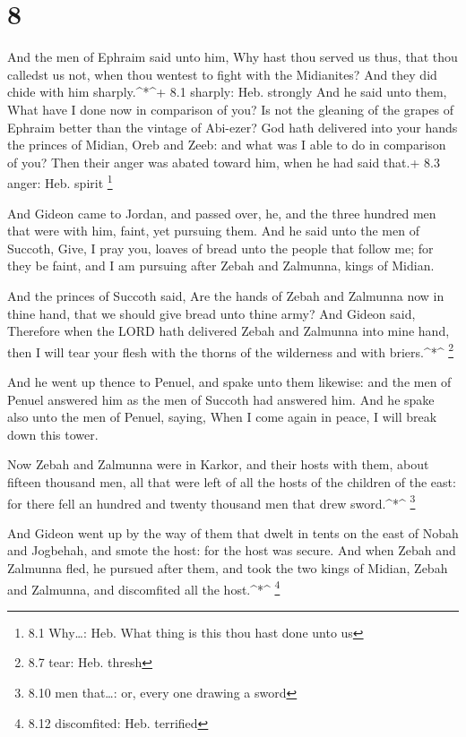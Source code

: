 \hypertarget{section-7}{%
\section{8}\label{section-7}}

 And the men of Ephraim said unto him, Why hast thou served
us thus, that thou calledst us not, when thou wentest to fight with the
Midianites? And they did chide with him sharply.\^{}*\^{}+ 8.1 sharply:
Heb. strongly  And he said unto them, What have I done now
in comparison of you? Is not the gleaning of the grapes of Ephraim
better than the vintage of Abi-ezer?  God hath delivered
into your hands the princes of Midian, Oreb and Zeeb: and what was I
able to do in comparison of you? Then their anger was abated toward him,
when he had said that.+ 8.3 anger: Heb. spirit \footnote{8.1 Why\ldots:
  Heb. What thing is this thou hast done unto us}

 And Gideon came to Jordan, and passed over, he, and the
three hundred men that were with him, faint, yet pursuing them.
 And he said unto the men of Succoth, Give, I pray you,
loaves of bread unto the people that follow me; for they be faint, and I
am pursuing after Zebah and Zalmunna, kings of Midian.

 And the princes of Succoth said, Are the hands of Zebah and
Zalmunna now in thine hand, that we should give bread unto thine army?
 And Gideon said, Therefore when the LORD hath delivered
Zebah and Zalmunna into mine hand, then I will tear your flesh with the
thorns of the wilderness and with briers.\^{}*\^{} \footnote{8.7 tear:
  Heb. thresh}

 And he went up thence to Penuel, and spake unto them
likewise: and the men of Penuel answered him as the men of Succoth had
answered him.  And he spake also unto the men of Penuel,
saying, When I come again in peace, I will break down this tower.

 Now Zebah and Zalmunna were in Karkor, and their hosts
with them, about fifteen thousand men, all that were left of all the
hosts of the children of the east: for there fell an hundred and twenty
thousand men that drew sword.\^{}*\^{} \footnote{8.10 men that\ldots:
  or, every one drawing a sword}

 And Gideon went up by the way of them that dwelt in tents
on the east of Nobah and Jogbehah, and smote the host: for the host was
secure.  And when Zebah and Zalmunna fled, he pursued after
them, and took the two kings of Midian, Zebah and Zalmunna, and
discomfited all the host.\^{}*\^{} \footnote{8.12 discomfited: Heb.
  terrified}

